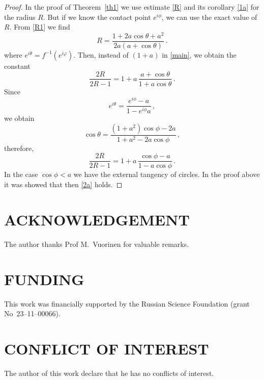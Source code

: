 \documentclass[12pt,a4paper]{amsart}
\begin{document}
\begin{proof}
In the proof of Theorem~\ref{th1} we use estimate \eqref{R} and its corollary \eqref{1a} for the radius $R$. But if we know the contact point $e^{i\phi}$, we can  use the exact value of $R$. From \eqref{R1} we find
$$
R=\frac{1+2a\cos\theta+a^2}{2a(a+\cos \theta) }\,.
$$
where $e^{i\theta}=f^{-1}(e^{i\varphi})$.
Then, instead of $(1+a)$ in \eqref{main}, we obtain the constant
$$
\frac{2R}{2R-1}=1+a\,\frac{a+\cos\theta}{1+a\cos \theta}\,.
$$
Since
$$
e^{i\theta}=\frac{e^{i\phi}-a}{1-e^{i\phi }a}\,,
$$
we obtain
$$
\cos\theta= \frac{(1+a^2)\cos\phi-2a}{1+a^2-2a\cos \phi}\,,
$$
therefore,
$$
\frac{2R}{2R-1}=1+a\,\frac{\cos\phi-a}{1-a\cos\phi}\,.
$$
In the case $\cos\phi< a$ we have the external tangency of circles. In the proof above it was showed that then \eqref{2a} holds.
\end{proof}

\section{ACKNOWLEDGEMENT}

The author thanks Prof M.~Vuorinen for valuable remarks.

\section{FUNDING}
This work was financially supported by the Russian Science Foundation (grant No~23--11--00066).

\section{CONFLICT OF INTEREST}
The author of this work declare that he has no conflicts of interest.
\end{document}
